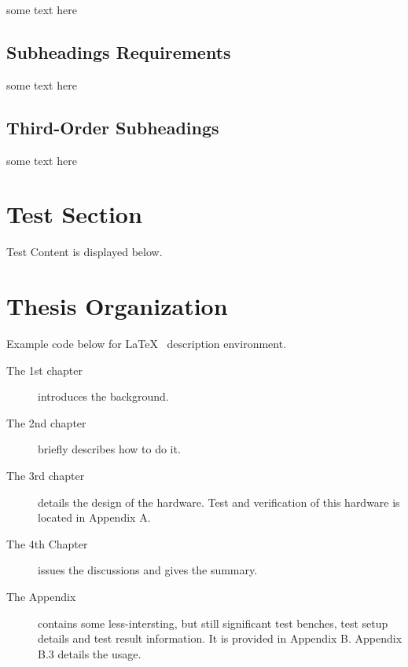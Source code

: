 some text here

\subsection{Subheadings Requirements}
some text here
 
 \subsection{Third-Order Subheadings}
 
some text here
 \section{Test Section}
 
 Test Content is displayed below.
 
 \section{Thesis Organization}
 
Example code below for \LaTeX ~  description environment. 
 
 \begin{description}
 \item[The 1st chapter] introduces the background.
 \item[The 2nd chapter]  briefly describes how to do it.
 \item[The 3rd chapter] details the design of the hardware. Test and verification of this hardware is located in Appendix A.
 \item[The 4th Chapter] issues the discussions and gives the summary.
 \item[The Appendix] contains some less-intersting, but still significant test benches, test setup details and test result information. It is provided in Appendix B. Appendix B.3 details
the usage.
 \end{description}
 

 






 


